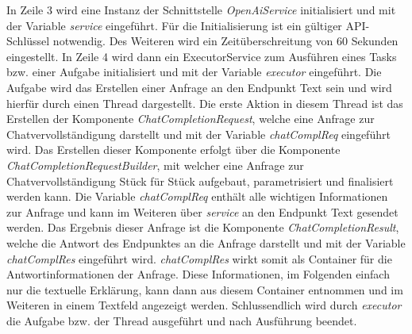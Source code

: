 In Zeile 3 wird eine Instanz der Schnittstelle \textit{OpenAiService} initialisiert und mit der Variable \textit{service} eingeführt.
Für die Initialisierung ist ein gültiger API-Schlüssel notwendig.
Des Weiteren wird ein Zeitüberschreitung von 60 Sekunden eingestellt.
In Zeile 4 wird dann ein ExecutorService zum Ausführen eines Tasks bzw. einer Aufgabe initialisiert und mit der Variable \textit{executor} eingeführt.
Die Aufgabe wird das Erstellen einer Anfrage an den Endpunkt Text sein und wird hierfür durch einen Thread dargestellt.
Die erste Aktion in diesem Thread ist das Erstellen der Komponente \textit{ChatCompletionRequest}, welche eine Anfrage zur Chatvervollständigung darstellt und mit der Variable \textit{chatComplReq} eingeführt wird.
Das Erstellen dieser Komponente erfolgt über die Komponente \textit{ChatCompletionRequestBuilder}, mit welcher eine Anfrage zur Chatvervollständigung Stück für Stück aufgebaut, parametrisiert und finalisiert werden kann.
Die Variable \textit{chatComplReq} enthält alle wichtigen Informationen zur Anfrage und kann im Weiteren über \textit{service} an den Endpunkt Text gesendet werden.
Das Ergebnis dieser Anfrage ist die Komponente \textit{ChatCompletionResult}, welche die Antwort des Endpunktes an die Anfrage darstellt und mit der Variable \textit{chatComplRes} eingeführt wird.
\textit{chatComplRes} wirkt somit als Container für die Antwortinformationen der Anfrage.
Diese Informationen, im Folgenden einfach nur die textuelle Erklärung, kann dann aus diesem Container entnommen und im Weiteren in einem Textfeld angezeigt werden.
Schlussendlich wird durch \textit{executor} die Aufgabe bzw. der Thread ausgeführt und nach Ausführung beendet.



